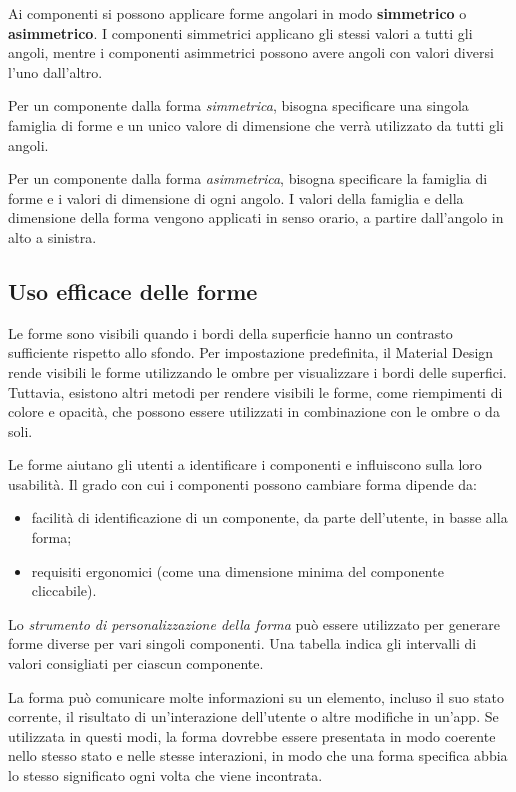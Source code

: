\documentclass[12pt, a4paper]{report}
\begin{document}
	Ai componenti si possono applicare forme angolari in modo \textbf{simmetrico} o \textbf{asimmetrico}.
	I componenti simmetrici applicano gli stessi valori a tutti gli angoli, mentre i componenti asimmetrici possono avere angoli con valori diversi l'uno dall'altro.

	Per un componente dalla forma \textit{simmetrica}, bisogna specificare una singola famiglia di forme e un unico valore di dimensione che verrà utilizzato da tutti gli angoli.

	Per un componente dalla forma \textit{asimmetrica}, bisogna specificare la famiglia di forme e i valori di dimensione di ogni angolo. I valori della famiglia e della dimensione della forma vengono applicati in senso orario, a partire dall'angolo in alto a sinistra.

	\subsection{Uso efficace delle forme}
	Le forme sono visibili quando i bordi della superficie hanno un contrasto sufficiente rispetto allo sfondo. Per impostazione predefinita, il Material Design rende visibili le forme utilizzando le ombre per visualizzare i bordi delle superfici.
	Tuttavia, esistono altri metodi per rendere visibili le forme, come riempimenti di colore e opacità, che possono essere utilizzati in combinazione con le ombre o da soli.

	Le forme aiutano gli utenti a identificare i componenti e influiscono sulla loro usabilità. Il grado con cui i componenti possono cambiare forma dipende da:
	\begin{itemize}
		\item facilità di identificazione di un componente, da parte dell’utente, in basse alla forma;
		\item requisiti ergonomici (come una dimensione minima del componente cliccabile).
	\end{itemize}

	Lo \textit{strumento di personalizzazione della forma} può essere utilizzato per generare forme diverse per vari singoli componenti. Una tabella indica gli intervalli di valori consigliati per ciascun componente.

	La forma può comunicare molte informazioni su un elemento, incluso il suo stato corrente, il risultato di un'interazione dell'utente o altre modifiche in un'app. Se utilizzata in questi modi, la forma dovrebbe essere presentata in modo coerente
	nello stesso stato e nelle stesse interazioni, in modo che una forma specifica abbia lo stesso significato ogni volta che viene incontrata.
\end{document}
